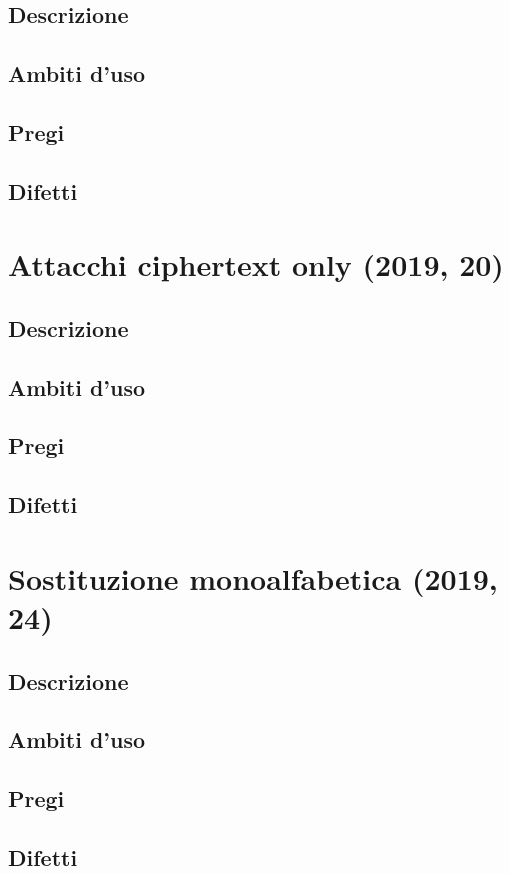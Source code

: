 \documentclass[10pt,oneside,a4paper]{article}
\begin{document}
\subsection{Descrizione}
\subsection{Ambiti d'uso}
\subsection{Pregi}
\subsection{Difetti}
\section{Attacchi ciphertext only (2019, 20)}
\subsection{Descrizione}
\subsection{Ambiti d'uso}
\subsection{Pregi}
\subsection{Difetti}
\section{Sostituzione monoalfabetica (2019, 24)}
\subsection{Descrizione}
\subsection{Ambiti d'uso}
\subsection{Pregi}
\subsection{Difetti}
\end{document}
